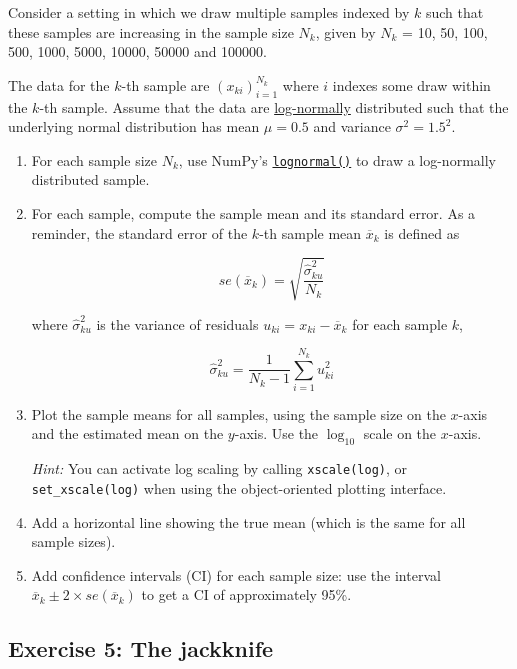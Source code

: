 \documentclass[10pt]{scrartcl}
\begin{document}
Consider a setting in which we draw multiple samples indexed by \(k\)
such that these samples are increasing in the sample size \(N_k\), given
by \(N_k\) = 10, 50, 100, 500, 1000, 5000, 10000, 50000 and 100000.

The data for the \(k\)-th sample are \((x_{ki})_{i=1}^{N_k}\) where
\(i\) indexes some draw within the \(k\)-th sample. Assume that the data
are
\href{https://en.wikipedia.org/wiki/Log-normal_distribution}{log-normally}
distributed such that the underlying normal distribution has mean
\(\mu=0.5\) and variance \(\sigma^2 = 1.5^2\).

\begin{enumerate}
\def\labelenumi{\arabic{enumi}.}
\item
  For each sample size \(N_k\), use NumPy's
  \href{https://numpy.org/doc/stable/reference/random/generated/numpy.random.Generator.lognormal.html}{\texttt{lognormal()}}
  to draw a log-normally distributed sample.
\item
  For each sample, compute the sample mean and its standard error. As a
  reminder, the standard error of the \(k\)-th sample mean
  \(\overline{x}_k\) is defined as

  \[se(\overline{x}_k) = \sqrt{\frac{\widehat{\sigma}_{ku}^2}{N_k}}\]

  where \(\widehat{\sigma}_{ku}^2\) is the variance of residuals
  \(u_{ki} = x_{ki} - \overline{x}_k\) for each sample \(k\),

  \[\widehat{\sigma}_{ku}^2 = \frac{1}{N_k-1}\sum_{i=1}^{N_k} u_{ki}^2\]
\item
  Plot the sample means for all samples, using the sample size on the
  \(x\)-axis and the estimated mean on the \(y\)-axis. Use the
  \(\log_{10}\) scale on the \(x\)-axis.

  \emph{Hint:} You can activate log scaling by calling
  \texttt{xscale(\textquotesingle{}log\textquotesingle{})}, or
  \texttt{set\_xscale(\textquotesingle{}log\textquotesingle{})} when
  using the object-oriented plotting interface.
\item
  Add a horizontal line showing the true mean (which is the same for all
  sample sizes).
\item
  Add confidence intervals (CI) for each sample size: use the interval
  \(\overline{x}_k \pm 2\times se(\overline{x}_k)\) to get a CI of
  approximately 95\%.
\end{enumerate}

    \hypertarget{exercise-5-the-jackknife}{%
\subsection{Exercise 5: The jackknife}\label{exercise-5-the-jackknife}}
\end{document}
